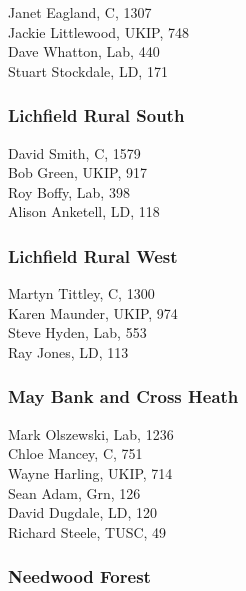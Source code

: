 \documentclass[a4paper,openany,10pt]{book}
\begin{document}
Janet Eagland, C, 1307\\
Jackie Littlewood, UKIP, 748\\
Dave Whatton, Lab, 440\\
Stuart Stockdale, LD, 171\\


\subsubsection*{Lichfield Rural South}



David Smith, C, 1579\\
Bob Green, UKIP, 917\\
Roy Boffy, Lab, 398\\
Alison Anketell, LD, 118\\


\subsubsection*{Lichfield Rural West}



Martyn Tittley, C, 1300\\
Karen Maunder, UKIP, 974\\
Steve Hyden, Lab, 553\\
Ray Jones, LD, 113\\


\subsubsection*{May Bank and Cross Heath}



Mark Olszewski, Lab, 1236\\
Chloe Mancey, C, 751\\
Wayne Harling, UKIP, 714\\
Sean Adam, Grn, 126\\
David Dugdale, LD, 120\\
Richard Steele, TUSC, 49\\


\subsubsection*{Needwood Forest}
\end{document}
